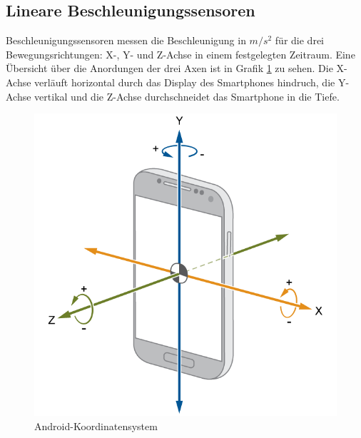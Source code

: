 \documentclass[11pt,a4paper]{report}
\begin{document}
\subsection{Lineare Beschleunigungssensoren}
Beschleunigungssensoren messen die Beschleunigung in $m/s^2$ für die drei Bewegungsrichtungen: X-, Y- und Z-Achse in einem festgelegten Zeitraum.
Eine Übersicht über die Anordungen der drei Axen ist in Grafik \ref{fig:and_axes} zu sehen.
Die X-Achse verläuft horizontal durch das Display des Smartphones hindruch, die Y-Achse vertikal und die Z-Achse durchschneidet das Smartphone in die Tiefe.
\begin{figure}[htbp]
  \centering
  \includegraphics[width=.9\textwidth]{images/android_axes.png}
  \caption{Android-Koordinatensystem}
  \label{fig:and_axes}
\end{figure}
\end{document}
